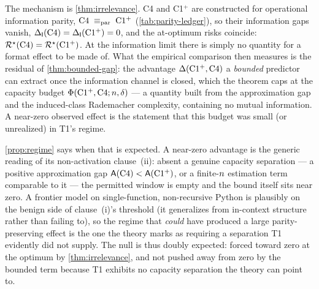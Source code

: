 The mechanism is \cref{thm:irrelevance}. C4 and C1${}^{+}$ are constructed for
operational information parity, $\mathrm{C}4\;\equiv_{\mathrm{par}}\;\mathrm{C1^{+}}$
(\cref{tab:parity-ledger}), so their information gaps vanish,
$\Delta_{\mathsf{I}}\!\left(\mathrm{C}4\right)=\Delta_{\mathsf{I}}\!\left(\mathrm{C1^{+}}\right)=0$, and the at-optimum risks
coincide: $\mathcal{R}^{\star}(\mathrm{C}4)=\mathcal{R}^{\star}(\mathrm{C1^{+}})$. At the information
limit there is simply no quantity for a format effect to be made of. What the
empirical comparison then measures is the residual of
\cref{thm:bounded-gap}: the advantage $\Delta(\mathrm{C1^{+}},\mathrm{C}4)$ a
\emph{bounded} predictor can extract once the information channel is closed,
which the theorem caps at the capacity budget
$\Phi(\mathrm{C1^{+}},\mathrm{C}4;n,\delta)$ --- a quantity built from the
approximation gap and the induced-class Rademacher complexity, containing no
mutual information. A near-zero observed effect is the statement that this
budget was small (or unrealized) in T1's regime.

\cref{prop:regime} says when that is expected. A near-zero advantage is the
generic reading of its non-activation clause~(ii): absent a genuine capacity
separation --- a positive approximation gap $\mathsf{A}(\mathrm{C}4)<
\mathsf{A}(\mathrm{C1^{+}})$, or a finite-$n$ estimation term comparable to
it --- the permitted window is empty and the bound itself sits near zero. A
frontier model on single-function, non-recursive Python is plausibly on the
benign side of clause~(i)'s threshold (it generalizes from in-context structure
rather than failing to), so the regime that \emph{could} have produced a large
parity-preserving effect is the one the theory marks as requiring a separation
T1 evidently did not supply. The null is thus doubly expected: forced toward
zero at the optimum by \cref{thm:irrelevance}, and not pushed away from zero by
the bounded term because T1 exhibits no capacity separation the theory can point
to.


